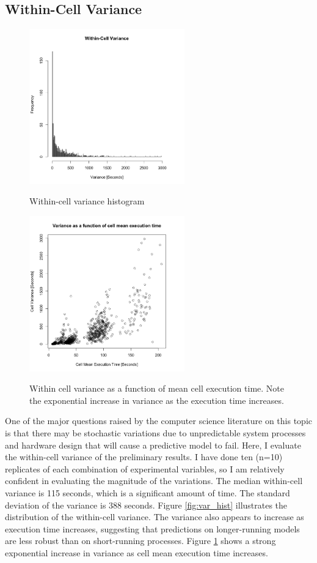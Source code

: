 \documentclass[a4paper]{article}
\begin{document}
\subsection{Within-Cell Variance}

\begin{figure}
\begin{centering}
\includegraphics[width=0.6\textwidth]{var_hist.png}
\caption{Within-cell variance histogram}\label{fig:var_hist}
\includegraphics[width=0.6\textwidth]{var_mean.png}
\caption{Within cell variance as a function of mean cell execution time.  Note the exponential increase in variance as the execution time increases.}\label{fig:var_mean}
\end{centering}
\end{figure}


One of the major questions raised by the computer science literature on this topic is that there may be stochastic variations due to unpredictable system processes and hardware design that will cause a predictive model to fail.  Here, I evaluate the within-cell variance of the preliminary results.  I have done ten (n=10) replicates of each combination of experimental variables, so I am relatively confident in evaluating the magnitude of the variations.  The median within-cell variance is 115 seconds, which is a significant amount of time. The standard deviation of the variance is 388 seconds.  Figure \ref{fig:var_hist} illustrates the distribution of the within-cell variance.  The variance also appears to increase as execution time increases, suggesting that predictions on longer-running models are less robust than on short-running processes. Figure \ref{fig:var_mean} shows a strong exponential increase in variance as cell mean execution time increases. 
\end{document}
